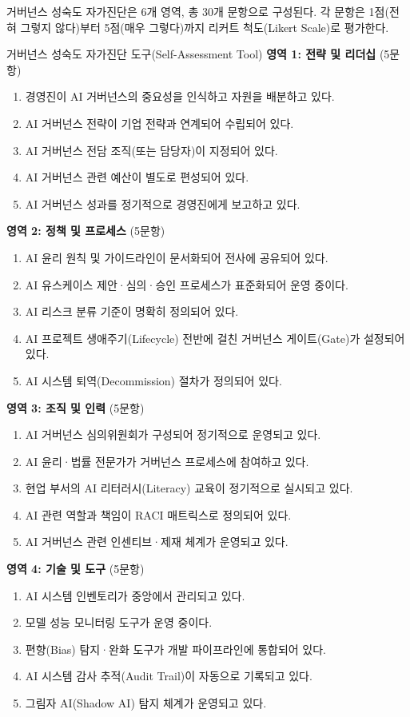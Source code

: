 거버넌스 성숙도 자가진단은 6개 영역, 총 30개 문항으로 구성된다. 각 문항은 1점(전혀 그렇지 않다)부터 5점(매우 그렇다)까지 리커트 척도(Likert Scale)로 평가한다.

\begin{practicaltool}{거버넌스 성숙도 자가진단 도구(Self-Assessment Tool)}
\textbf{영역 1: 전략 및 리더십} (5문항)
\begin{enumerate}
    \item 경영진이 AI 거버넌스의 중요성을 인식하고 자원을 배분하고 있다.
    \item AI 거버넌스 전략이 기업 전략과 연계되어 수립되어 있다.
    \item AI 거버넌스 전담 조직(또는 담당자)이 지정되어 있다.
    \item AI 거버넌스 관련 예산이 별도로 편성되어 있다.
    \item AI 거버넌스 성과를 정기적으로 경영진에게 보고하고 있다.
\end{enumerate}

\textbf{영역 2: 정책 및 프로세스} (5문항)
\begin{enumerate}
    \item AI 윤리 원칙 및 가이드라인이 문서화되어 전사에 공유되어 있다.
    \item AI 유스케이스 제안·심의·승인 프로세스가 표준화되어 운영 중이다.
    \item AI 리스크 분류 기준이 명확히 정의되어 있다.
    \item AI 프로젝트 생애주기(Lifecycle) 전반에 걸친 거버넌스 게이트(Gate)가 설정되어 있다.
    \item AI 시스템 퇴역(Decommission) 절차가 정의되어 있다.
\end{enumerate}

\textbf{영역 3: 조직 및 인력} (5문항)
\begin{enumerate}
    \item AI 거버넌스 심의위원회가 구성되어 정기적으로 운영되고 있다.
    \item AI 윤리·법률 전문가가 거버넌스 프로세스에 참여하고 있다.
    \item 현업 부서의 AI 리터러시(Literacy) 교육이 정기적으로 실시되고 있다.
    \item AI 관련 역할과 책임이 RACI 매트릭스로 정의되어 있다.
    \item AI 거버넌스 관련 인센티브·제재 체계가 운영되고 있다.
\end{enumerate}

\textbf{영역 4: 기술 및 도구} (5문항)
\begin{enumerate}
    \item AI 시스템 인벤토리가 중앙에서 관리되고 있다.
    \item 모델 성능 모니터링 도구가 운영 중이다.
    \item 편향(Bias) 탐지·완화 도구가 개발 파이프라인에 통합되어 있다.
    \item AI 시스템 감사 추적(Audit Trail)이 자동으로 기록되고 있다.
    \item 그림자 AI(Shadow AI) 탐지 체계가 운영되고 있다.
\end{enumerate}


\end{practicaltool}

